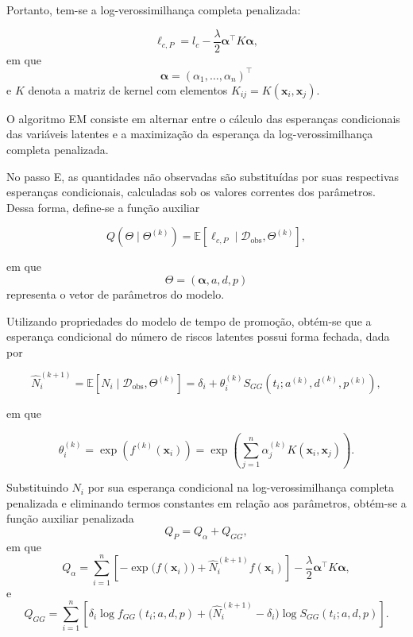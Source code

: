 Portanto, tem-se a log-verossimilhança completa penalizada:

\begin{equation}
\ell_{c, P} = l_c - \frac{\lambda}{2} \boldsymbol{\alpha}^{\top} K \boldsymbol{\alpha},
\end{equation}
em que
\begin{equation}
\boldsymbol{\alpha} = (\alpha_1,\ldots,\alpha_n)^{\top}
\end{equation}
e $K$ denota a matriz de kernel com elementos $K_{ij}=K(\mathbf{x}_i,\mathbf{x}_j)$.

O algoritmo EM consiste em alternar entre o cálculo das esperanças condicionais das variáveis latentes e a maximização da esperança da log-verossimilhança completa penalizada.

No passo E, as quantidades não observadas são substituídas por suas respectivas esperanças condicionais, calculadas sob os valores correntes dos parâmetros. Dessa forma, define-se a função auxiliar

\begin{equation}
Q\!\left(
\Theta \mid \Theta^{(k)}
\right)
=
\mathbb{E}
\left[
\ell_{c,P}
\mid
\mathcal{D}_{\mathrm{obs}},
\Theta^{(k)}
\right],
\end{equation}

em que
\[
\Theta=(\boldsymbol{\alpha},a,d,p)
\]
representa o vetor de parâmetros do modelo.

Utilizando propriedades do modelo de tempo de promoção, obtém-se que a esperança condicional do número de riscos latentes possui forma fechada, dada por

\begin{equation}
\widehat{N}_i^{(k+1)}
=
\mathbb{E}
\!\left[
N_i
\mid
\mathcal{D}_{\mathrm{obs}},
\Theta^{(k)}
\right]
=
\delta_i
+
\theta_i^{(k)}
S_{GG}
\!\left(
t_i;
a^{(k)},
d^{(k)},
p^{(k)}
\right),
\end{equation}

em que

\begin{equation}
\theta_i^{(k)}
=
\exp
\!\left(
f^{(k)}(\mathbf{x}_i)
\right)
=
\exp
\!\left(
\sum_{j=1}^{n}
\alpha_j^{(k)}
K(\mathbf{x}_i,\mathbf{x}_j)
\right).
\end{equation}

Substituindo \(N_i\) por sua esperança condicional na log-verossimilhança completa penalizada e eliminando
termos constantes em relação aos parâmetros, obtém-se a função auxiliar penalizada
\begin{equation}
Q_P
=
Q_{\alpha}
+
Q_{GG},
\end{equation}
em que
\begin{equation}
Q_{\alpha}
=
\sum_{i=1}^{n}
\left[
-\exp\!\bigl(f(\mathbf{x}_i)\bigr)
+
\widehat N_i^{(k+1)}
f(\mathbf{x}_i)
\right]
-
\frac{\lambda}{2}
\boldsymbol{\alpha}^{\top}
K
\boldsymbol{\alpha},
\end{equation}
e
\begin{equation}
Q_{GG}
=
\sum_{i=1}^{n}
\left[
\delta_i
\log f_{GG}(t_i;a,d,p)
+
\bigl(\widehat N_i^{(k+1)}-\delta_i\bigr)
\log S_{GG}(t_i;a,d,p)
\right].
\end{equation}

